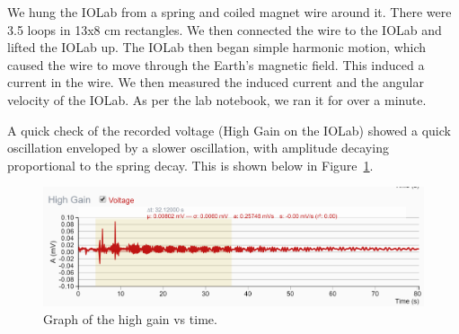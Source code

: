 \documentclass[11pt]{article}
\begin{document}
    We hung the IOLab from a spring and coiled magnet wire around it.
    There were 3.5 loops in 13x8 cm rectangles.
    We then connected the wire to the IOLab and lifted the IOLab up.
    The IOLab then began simple harmonic motion, which caused the wire to move through the Earth's magnetic field.
    This induced a current in the wire.
    We then measured the induced current and the angular velocity of the IOLab.
    As per the lab notebook, we ran it for over a minute.

    A quick check of the recorded voltage (High Gain on the IOLab) showed a quick oscillation enveloped by a slower oscillation, with amplitude decaying proportional to the spring decay.
    This is shown below in Figure~\ref{fig:high_gain}.

    \begin{figure}[H]
        \centering
        \includegraphics[width=0.8\linewidth]{resources/images/high gain check}
        \caption{Graph of the high gain vs time.}
        \label{fig:high_gain}
    \end{figure}
\end{document}
